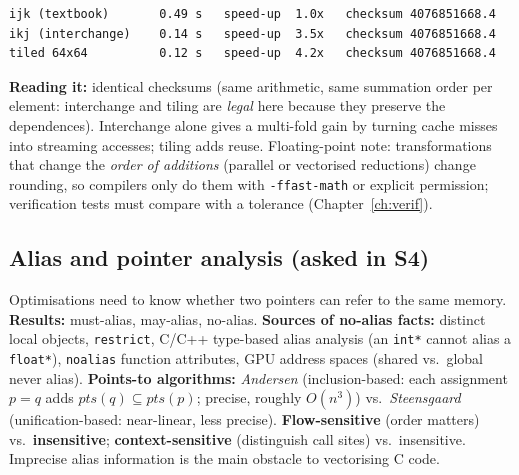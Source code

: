 \documentclass[10pt,a4paper,openany,oneside]{report}
\begin{document}
\begin{lstlisting}[style=out,title={Captured output (timings are measurements)}]
ijk (textbook)       0.49 s   speed-up  1.0x   checksum 4076851668.4
ikj (interchange)    0.14 s   speed-up  3.5x   checksum 4076851668.4
tiled 64x64          0.12 s   speed-up  4.2x   checksum 4076851668.4
\end{lstlisting}
\textbf{Reading it:} identical checksums (same arithmetic, same summation order per element: interchange and tiling are \emph{legal} here because they preserve the dependences). Interchange alone gives a multi-fold gain by turning cache misses into streaming accesses; tiling adds reuse. Floating-point note: transformations that change the \emph{order of additions} (parallel or vectorised reductions) change rounding, so compilers only do them with \texttt{-ffast-math} or explicit permission; verification tests must compare with a tolerance (Chapter~\ref{ch:verif}).

\subsection{Alias and pointer analysis (asked in S4)}
Optimisations need to know whether two pointers can refer to the same memory. \textbf{Results:} must-alias, may-alias, no-alias. \textbf{Sources of no-alias facts:} distinct local objects, \texttt{restrict}, C/C++ type-based alias analysis (an \texttt{int*} cannot alias a \texttt{float*}), \texttt{noalias} function attributes, GPU address spaces (shared vs.\ global never alias). \textbf{Points-to algorithms:} \emph{Andersen} (inclusion-based: each assignment $p=q$ adds $pts(q)\subseteq pts(p)$; precise, roughly $O(n^3)$) vs.\ \emph{Steensgaard} (unification-based: near-linear, less precise). \textbf{Flow-sensitive} (order matters) vs.\ \textbf{insensitive}; \textbf{context-sensitive} (distinguish call sites) vs.\ insensitive. Imprecise alias information is the main obstacle to vectorising C code.
\end{document}
